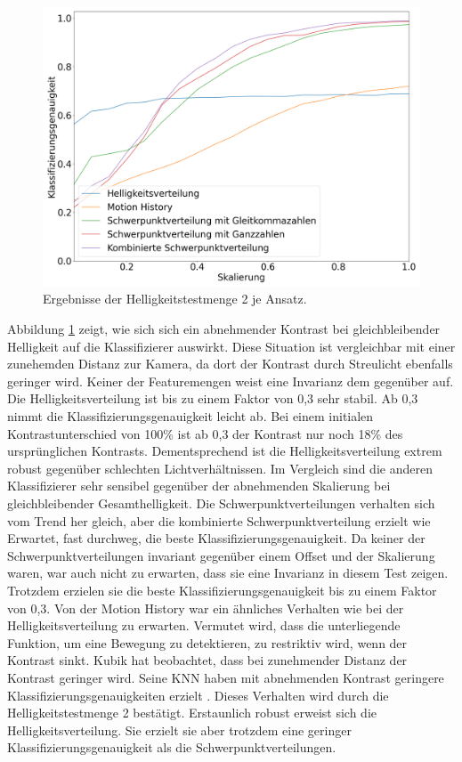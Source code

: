 \begin{figure}[h!]
    \centering
    \includegraphics[width=\linewidth]{images/brightness2_scaling.png}
    \caption{Ergebnisse der Helligkeitstestmenge 2 je Ansatz.}
    \label{fig:brightness2_scaling}
\end{figure}
\newline
\newline
Abbildung \ref{fig:brightness2_scaling} zeigt, wie sich sich ein abnehmender Kontrast bei gleichbleibender Helligkeit auf die Klassifizierer auswirkt. Diese Situation ist vergleichbar mit einer zunehemden Distanz
zur Kamera, da dort der Kontrast durch Streulicht ebenfalls geringer wird. Keiner der Featuremengen weist eine Invarianz dem gegenüber auf. Die Helligkeitsverteilung ist bis zu einem Faktor von 0,3 sehr stabil. Ab 0,3
nimmt die Klassifizierungsgenauigkeit leicht ab. Bei einem initialen Kontrastunterschied von 100\% ist ab 0,3 der Kontrast nur noch 18\% des ursprünglichen Kontrasts. Dementsprechend ist die Helligkeitsverteilung extrem
robust gegenüber schlechten Lichtverhältnissen. Im Vergleich sind die anderen Klassifizierer sehr sensibel gegenüber der abnehmenden Skalierung bei gleichbleibender Gesamthelligkeit.
Die Schwerpunktverteilungen verhalten sich vom Trend her gleich, aber die
kombinierte Schwerpunktverteilung erzielt wie Erwartet, fast durchweg, die beste Klassifizierungsgenauigkeit. Da keiner der Schwerpunktverteilungen invariant gegenüber einem Offset und der Skalierung waren, war auch
nicht zu erwarten, dass sie eine Invarianz in diesem Test zeigen. Trotzdem erzielen sie die beste Klassifizierungsgenauigkeit bis zu einem Faktor von 0,3. Von der Motion History war ein ähnliches Verhalten wie bei der
Helligkeitsverteilung zu erwarten. Vermutet wird, dass die unterliegende Funktion, um eine Bewegung zu detektieren, zu restriktiv wird, wenn der Kontrast sinkt.
\newline
\newline
Kubik hat beobachtet, dass bei zunehmender Distanz der Kontrast geringer wird. Seine KNN haben mit abnehmenden Kontrast geringere Klassifizierungsgenauigkeiten erzielt \cite{kubikThesis}. Dieses Verhalten wird durch die
Helligkeitstestmenge 2 bestätigt. Erstaunlich robust erweist sich die Helligkeitsverteilung. Sie erzielt sie aber trotzdem eine geringer Klassifizierungsgenauigkeit als die Schwerpunktverteilungen.